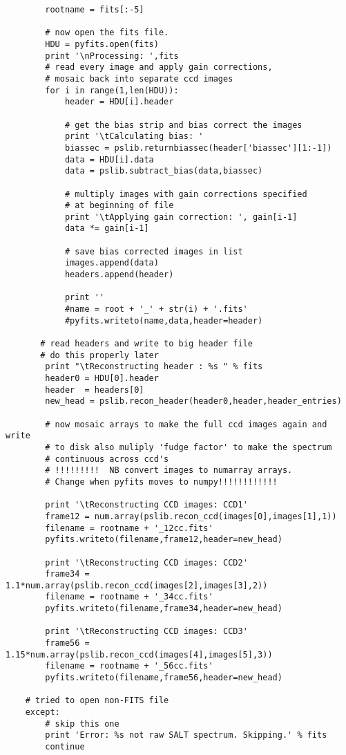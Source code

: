 \begin{footnotesize}
\begin{verbatim}
        rootname = fits[:-5]

        # now open the fits file.
        HDU = pyfits.open(fits)
        print '\nProcessing: ',fits
        # read every image and apply gain corrections, 
        # mosaic back into separate ccd images
        for i in range(1,len(HDU)):
            header = HDU[i].header

            # get the bias strip and bias correct the images
            print '\tCalculating bias: '
            biassec = pslib.returnbiassec(header['biassec'][1:-1])
            data = HDU[i].data
            data = pslib.subtract_bias(data,biassec)

            # multiply images with gain corrections specified 
            # at beginning of file
            print '\tApplying gain correction: ', gain[i-1]
            data *= gain[i-1]

            # save bias corrected images in list
            images.append(data)
            headers.append(header)  

            print ''
            #name = root + '_' + str(i) + '.fits'
            #pyfits.writeto(name,data,header=header)

       # read headers and write to big header file
       # do this properly later
        print "\tReconstructing header : %s " % fits
        header0 = HDU[0].header
        header  = headers[0]
        new_head = pslib.recon_header(header0,header,header_entries)

        # now mosaic arrays to make the full ccd images again and write
        # to disk also muliply 'fudge factor' to make the spectrum 
        # continuous across ccd's
        # !!!!!!!!!  NB convert images to numarray arrays. 
        # Change when pyfits moves to numpy!!!!!!!!!!!!

        print '\tReconstructing CCD images: CCD1'
        frame12 = num.array(pslib.recon_ccd(images[0],images[1],1))
        filename = rootname + '_12cc.fits'
        pyfits.writeto(filename,frame12,header=new_head)

        print '\tReconstructing CCD images: CCD2'
        frame34 = 1.1*num.array(pslib.recon_ccd(images[2],images[3],2))
        filename = rootname + '_34cc.fits'
        pyfits.writeto(filename,frame34,header=new_head)

        print '\tReconstructing CCD images: CCD3'
        frame56 = 1.15*num.array(pslib.recon_ccd(images[4],images[5],3))
        filename = rootname + '_56cc.fits'
        pyfits.writeto(filename,frame56,header=new_head)

    # tried to open non-FITS file
    except:
        # skip this one
        print 'Error: %s not raw SALT spectrum. Skipping.' % fits
        continue
\end{verbatim}

\end{footnotesize}



